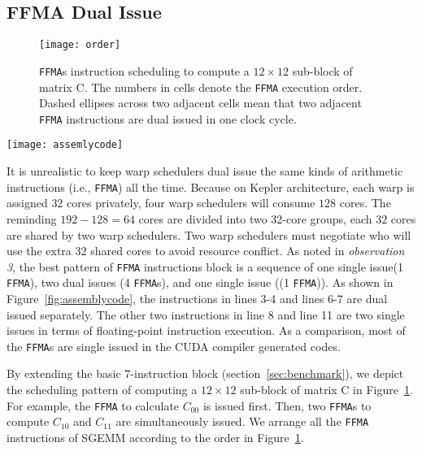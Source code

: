 \subsection{FFMA Dual Issue}
\label{sec:ffma-dual}

\begin{figure}[htbp]
\begin{center}
\texttt{[image: order]}
\caption{{\tt FFMA}s instruction scheduling to compute a $12\times 12$ sub-block of matrix C.  The numbers in
cells denote the {\tt FFMA} execution order. Dashed ellipses across two adjacent cells mean that two adjacent {\tt FFMA} instructions are dual issued in one clock cycle.}
\label{fig:order}
\end{center}
\end{figure}

\begin{figure*}[htbp]
\begin{center}
\texttt{[image: assemlycode]}
    \caption{The comparison of compiler generated codes and our tuned assembly codes.}
\label{fig:assemblycode}
\end{center}
\end{figure*}

It is unrealistic to keep warp schedulers dual issue the same kinds of arithmetic instructions (i.e., {\tt FFMA}) all
the time. Because on Kepler architecture, each warp is assigned $32$ cores privately, four warp schedulers will consume
$128$ cores. The reminding $192-128=64$ cores are divided into two 32-core groups, each $32$ cores
are shared by two warp schedulers. Two warp schedulers must negotiate who will use the extra $32$ shared cores to avoid
resource conflict.
As noted in {\em observation 3}, the best pattern of {\tt FFMA} instructions block is a sequence of one single issue(1
{\tt FFMA}), two dual issues (4 {\tt FFMA}s), and one single issue ((1 {\tt FFMA})). As shown in
Figure~\ref{fig:assemblycode}, the instructions in lines 3-4 and lines 6-7 are dual issued separately.
The other two instructions in line 8 and line 11 are two single issues in terms of floating-point instruction
execution.
As a comparison, most of the {\tt FFMA}s are single issued in the CUDA compiler generated codes.

By extending the basic $7$-instruction block (section~\ref{sec:benchmark}), we depict the scheduling pattern of computing a $12\times 12$ sub-block of matrix C in Figure~\ref{fig:order}.
For example, the {\tt FFMA} to calculate $C_{00}$ is issued first.
Then, two {\tt FFMA}s to
compute $C_{10}$ and $C_{11}$ are simultaneously issued. We arrange all the {\tt FFMA} instructions of SGEMM according to the order in Figure~\ref{fig:order}.

